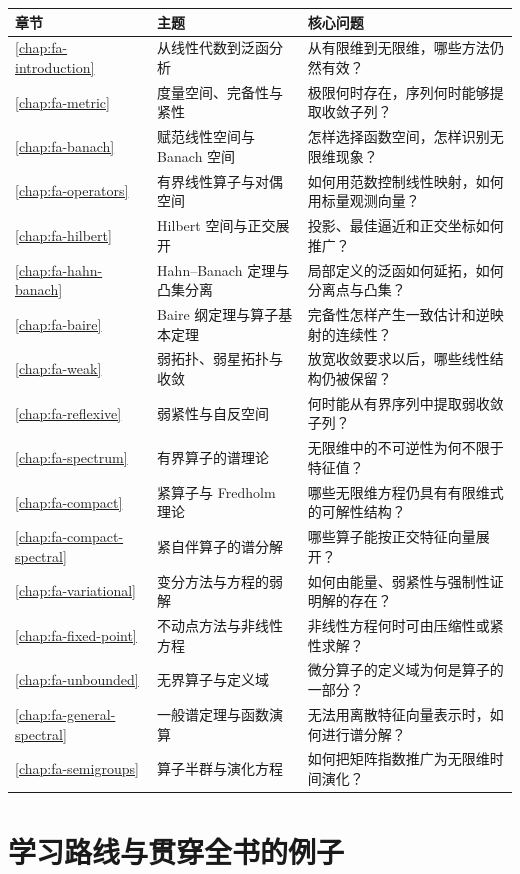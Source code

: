 \begin{longtable}{L{0.08\textwidth}L{0.32\textwidth}L{0.48\textwidth}}
\toprule
章节 & 主题 & 核心问题 \\
\midrule
\endhead
\ref{chap:fa-introduction} & 从线性代数到泛函分析 & 从有限维到无限维，哪些方法仍然有效？ \\
\ref{chap:fa-metric} & 度量空间、完备性与紧性 & 极限何时存在，序列何时能够提取收敛子列？ \\
\ref{chap:fa-banach} & 赋范线性空间与 Banach 空间 & 怎样选择函数空间，怎样识别无限维现象？ \\
\ref{chap:fa-operators} & 有界线性算子与对偶空间 & 如何用范数控制线性映射，如何用标量观测向量？ \\
\ref{chap:fa-hilbert} & Hilbert 空间与正交展开 & 投影、最佳逼近和正交坐标如何推广？ \\
\ref{chap:fa-hahn-banach} & Hahn--Banach 定理与凸集分离 & 局部定义的泛函如何延拓，如何分离点与凸集？ \\
\ref{chap:fa-baire} & Baire 纲定理与算子基本定理 & 完备性怎样产生一致估计和逆映射的连续性？ \\
\ref{chap:fa-weak} & 弱拓扑、弱星拓扑与收敛 & 放宽收敛要求以后，哪些线性结构仍被保留？ \\
\ref{chap:fa-reflexive} & 弱紧性与自反空间 & 何时能从有界序列中提取弱收敛子列？ \\
\ref{chap:fa-spectrum} & 有界算子的谱理论 & 无限维中的不可逆性为何不限于特征值？ \\
\ref{chap:fa-compact} & 紧算子与 Fredholm 理论 & 哪些无限维方程仍具有有限维式的可解性结构？ \\
\ref{chap:fa-compact-spectral} & 紧自伴算子的谱分解 & 哪些算子能按正交特征向量展开？ \\
\ref{chap:fa-variational} & 变分方法与方程的弱解 & 如何由能量、弱紧性与强制性证明解的存在？ \\
\ref{chap:fa-fixed-point} & 不动点方法与非线性方程 & 非线性方程何时可由压缩性或紧性求解？ \\
\ref{chap:fa-unbounded} & 无界算子与定义域 & 微分算子的定义域为何是算子的一部分？ \\
\ref{chap:fa-general-spectral} & 一般谱定理与函数演算 & 无法用离散特征向量表示时，如何进行谱分解？ \\
\ref{chap:fa-semigroups} & 算子半群与演化方程 & 如何把矩阵指数推广为无限维时间演化？ \\
\bottomrule
\end{longtable}

\section{学习路线与贯穿全书的例子}

